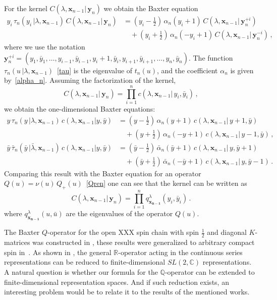 \documentclass[a4paper,11pt]{article}
\numberwithin{equation}{section}
\begin{document}
For the kernel $C(\lambda, \bm{x}_{n-1}|\,\bm{y}_{n})$ we obtain the Baxter equation
\begin{equation*}
	\begin{split}
		y_i\,\tau_n(y_i\,|\lambda,\bm{x}_{n-1})\,C(\lambda, \bm{x}_{n-1}|\,\bm{y}_{n}) 
		&= \left(y_i-\tfrac{1}{2}\right)\,\alpha_n(y_i+1)\,C(\lambda, \bm{x}_{n-1}|\,\bm{y}_{n}^{+i}) \\
		&\quad + \left(y_i+\tfrac{1}{2}\right)\,\alpha_n(-y_i+1)\,C(\lambda, \bm{x}_{n-1}|\,\bm{y}_{n}^{-i}) \,,
	\end{split}
\end{equation*}
where we use the notation $\bm{y}_{n}^{+i}=(y_1,\bar{y}_1, \ldots, y_{i-1}, \bar{y}_{i-1}, y_i+1, \bar{y}_i, y_{i+1}, \bar{y}_{i+1}, \ldots, y_n, \bar{y}_n)$.
The function $\tau_n(u\,|\lambda,\bm{x}_{n-1})$~\eqref{tau} is the eigenvalue of $t_n(u)$, and the coefficient $\alpha_n$ is given by~\eqref{alpha_n}.
Assuming the factorization of the kernel,
\begin{equation*}
	C(\lambda, \bm{x}_{n-1}|\,\bm{y}_{n}) = \prod\limits_{i=1}^{n} c(\lambda, \bm{x}_{n-1}|\,y_i, \bar{y}_i) \,,
\end{equation*} 
we obtain the one-dimensional Baxter equations:
\begin{align*}
	y\,\tau_n(y\,|\lambda,\bm{x}_{n-1})\,c(\lambda, \bm{x}_{n-1}|y, \bar{y}) 
	&= \left(y-\tfrac{1}{2}\right)\,\alpha_n(y+1)\,c(\lambda, \bm{x}_{n-1}|\,y+1, \bar{y}) \\
	&\quad + \left(y+\tfrac{1}{2}\right)\,\alpha_n(-y+1)\,c(\lambda, \bm{x}_{n-1}|\,y-1, \bar{y}) \,, \\[1em]
	\bar{y}\,\bar{\tau}_n(\bar{y}\,|\bar{\lambda},\bm{x}_{n-1})\,c(\lambda, \bm{x}_{n-1}|y, \bar{y}) 
	&= \left(\bar{y}-\tfrac{1}{2}\right)\,\bar{\alpha}_n(\bar{y}+1)\,c(\lambda, \bm{x}_{n-1}|\,y, \bar{y}+1) \\
	&\quad + \left(\bar{y}+\tfrac{1}{2}\right)\,\bar{\alpha}_n(-\bar{y}+1)\,c(\lambda, \bm{x}_{n-1}|\,y, \bar{y}-1) \,.
\end{align*}
Comparing this result with the Baxter equation for an operator $Q(u)=\nu(u)\,Q_+(u)$~\eqref{Qren} one can see that the kernel can be written as 
\begin{equation*}
	C(\lambda, \bm{x}_{n-1}|\,\bm{y}_{n}) = \prod\limits_{i=1}^{n} q^{\lambda}_{\bm{x_{n-1}}}(y_i,\bar{y}_i) \,.
\end{equation*} 
where $q^{\lambda}_{\bm{x_{n-1}}}(u,\bar{u})$ are the eigenvalues of the operator $Q(u)$.

The Baxter $Q$-operator for the open XXX spin chain with spin $\frac{1}{2}$ and diagonal $K$-matrices was constructed in \cite{Frassek_2015}, these results were generalized to arbitrary compact spin in~\cite{Frassek2022}. As shown in \cite{DM09,CDS}, the general $\mathbb{R}$-operator acting in the continuous series representations can be reduced to finite-dimensional $SL(2,\mathbb{C})$ representations. A natural question is whether our formula for the $\mathbb{Q}$-operator can be extended to finite-dimensional representation spaces.
And if such reduction exists, an interesting problem would be to relate it to the results of the mentioned works.
\end{document}
